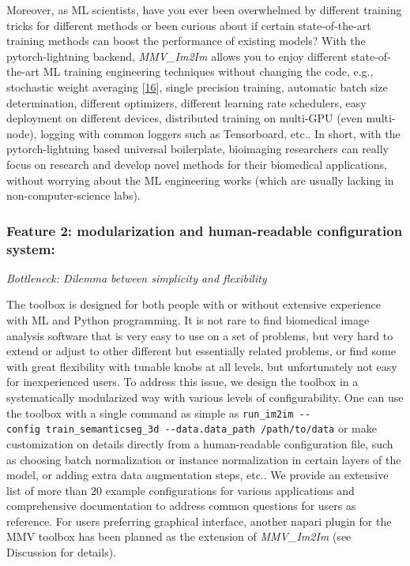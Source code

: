 Moreover, as ML scientists, have you ever been overwhelmed by different training tricks for different methods or been curious about if certain state-of-the-art training methods can boost the performance of existing models? With the pytorch-lightning backend, \emph{MMV\_Im2Im} allows you to enjoy different state-of-the-art ML training engineering techniques without changing the code, e.g., stochastic weight averaging {[}\protect\hyperlink{ref-qzeQFRn9}{16}{]}, single precision training, automatic batch size determination, different optimizers, different learning rate schedulers, easy deployment on different devices, distributed training on multi-GPU (even multi-node), logging with common loggers such as Tensorboard, etc.. In short, with the pytorch-lightning based universal boilerplate, bioimaging researchers can really focus on research and develop novel methods for their biomedical applications, without worrying about the ML engineering works (which are usually lacking in non-computer-science labs).

\hypertarget{feature-2-modularization-and-human-readable-configuration-system}{%
\subsubsection{Feature 2: modularization and human-readable configuration system:}\label{feature-2-modularization-and-human-readable-configuration-system}}

\emph{Bottleneck: Dilemma between simplicity and flexibility}

The toolbox is designed for both people with or without extensive experience with ML and Python programming. It is not rare to find biomedical image analysis software that is very easy to use on a set of problems, but very hard to extend or adjust to other different but essentially related problems, or find some with great flexibility with tunable knobs at all levels, but unfortunately not easy for inexperienced users. To address this issue, we design the toolbox in a systematically modularized way with various levels of configurability. One can use the toolbox with a single command as simple as \texttt{run\_im2im\ -\/-config\ train\_semanticseg\_3d\ -\/-data.data\_path\ /path/to/data} or make customization on details directly from a human-readable configuration file, such as choosing batch normalization or instance normalization in certain layers of the model, or adding extra data augmentation steps, etc.. We provide an extensive list of more than 20 example configurations for various applications and comprehensive documentation to address common questions for users as reference. For users preferring graphical interface, another napari plugin for the MMV toolbox has been planned as the extension of \emph{MMV\_Im2Im} (see Discussion for details).

